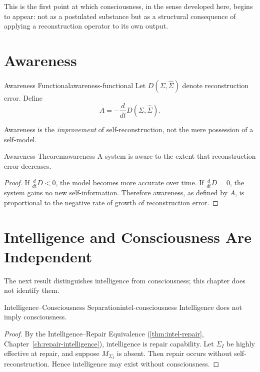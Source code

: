 \documentclass[12pt,twoside,openright]{book}
\begin{document}
This is the first point at which consciousness, in the
sense developed here, begins to appear: not as a postulated
substance but as a structural consequence of applying a
reconstruction operator to its own output.

\section{Awareness}
\label{sec:ch21-awareness}

\begin{definition}{Awareness Functional}{awareness-functional}
  Let $D(\Sigma, \hat{\Sigma})$ denote reconstruction error.
  Define
  \[
    A = -\frac{d}{dt} D(\Sigma, \hat{\Sigma}).
  \]
\end{definition}

Awareness is the \emph{improvement} of self-reconstruction,
not the mere possession of a self-model.

\begin{theorem}{Awareness Theorem}{awareness}
  A system is aware to the extent that reconstruction error
  decreases.
\end{theorem}

\begin{proof}
  If $\frac{d}{dt}D < 0$, the model becomes more accurate
  over time. If $\frac{d}{dt}D = 0$, the system gains no new
  self-information. Therefore awareness, as defined by $A$,
  is proportional to the negative rate of growth of
  reconstruction error.
\end{proof}

\section{Intelligence and Consciousness Are Independent}
\label{sec:ch21-separation}

The next result distinguishes intelligence from
consciousness; this chapter does not identify them.

\begin{theorem}{Intelligence--Consciousness Separation}{intel-consciousness}
  Intelligence does not imply consciousness.
\end{theorem}

\begin{proof}
  By the Intelligence--Repair Equivalence
  (\cref{thm:intel-repair}, Chapter~\ref{ch:repair-intelligence}),
  intelligence is repair capability. Let $\Sigma_I$ be
  highly effective at repair, and suppose $M_{\Sigma_I}$ is
  absent. Then repair occurs without self-reconstruction.
  Hence intelligence may exist without consciousness.
\end{proof}
\end{document}
